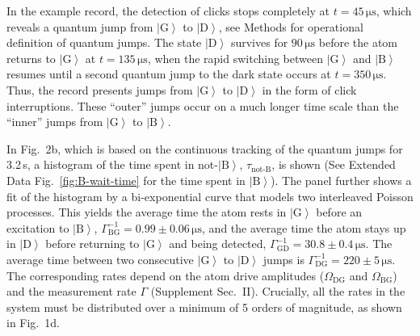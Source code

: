 \documentclass[
	 			preprint,     		superscriptaddress, 																longbibliography,
		amsmath, amssymb,
		aps,  prb,   		floatfix,
		linenumbers     
	]{revtex4-1}
\newcommand{\ket}[1]{\left|#1\right>}
\newcommand{\B}{\ket{\mathrm{B}}}
\begin{document}
In the example record, the detection of clicks stops completely at  $t=45\,\mathrm{\mu s}$, which reveals a quantum jump from $\ket{\mathrm{G}}$  to $\ket{\mathrm{D}}$, see Methods for operational definition of quantum jumps. 
The state $\ket{\mathrm{D}}$ survives for $90\, \mathrm{\mu s}$ before the atom returns to $\ket{\mathrm{G}}$ at $t =  135\, \mathrm{\mu s}$, when  the rapid switching between $\ket{\mathrm{G}}$ and $\ket{\mathrm{B}}$  resumes until a second quantum jump to the dark state occurs at $t = 350\, \mathrm{\mu s}$.
Thus, the record presents jumps from $\ket{\mathrm{G}}$ to $\ket{\mathrm{D}}$ in the form of click interruptions. These ``outer'' jumps occur on a much longer time scale than the ``inner'' jumps from $\ket{\mathrm{G}}$ to $\ket{\mathrm{B}}$.

In Fig.~2b, which is based on the continuous tracking of the quantum jumps for 3.2\,s, a histogram of the time spent in not-$\ket{\mathrm{B}}$, $\tau_{\operatorname{not-B}}$, is shown (See Extended Data Fig.~\ref{fig:B-wait-time} for the time spent in $\B$). 
The panel further shows a fit of the histogram by a bi-exponential curve that models two interleaved Poisson processes. 
This yields the average time the atom rests in $\ket{\mathrm{G}}$ before an excitation to $\ket{\mathrm{B}}$, $\Gamma_{\mathrm{BG}}^{-1} = 0.99\pm0.06\, \mathrm{\mu s}$, and the average time the atom stays up in $\ket{\mathrm{D}}$ before returning to $\ket{\mathrm{G}}$ and being detected, $\Gamma_{\mathrm{GD}}^{-1} = 30.8\pm0.4\, \mathrm{\mu s}$.
The average time between two consecutive $\ket{\mathrm{G}}$ to $\ket{\mathrm{D}}$ jumps  is $\Gamma_{\mathrm{DG}}^{-1} = 220\pm 5\, \mathrm{\mu s}$. The corresponding rates depend on the atom drive amplitudes ($\Omega_\mathrm{DG}$ and $\Omega_\mathrm{BG}$) and the measurement rate $\Gamma$ (Supplement Sec.~II).
Crucially, all the rates in the system must be distributed over a minimum of 5 orders of magnitude, as shown in Fig.~1d. 
\end{document}
